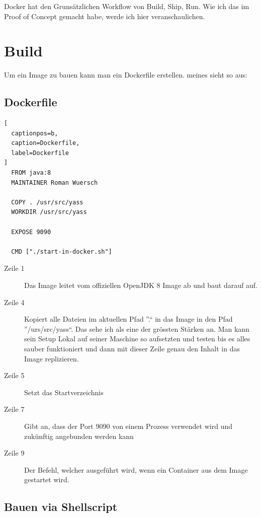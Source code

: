 Docker hat den Grunsätzlichen Workflow von Build, Ship, Run. Wie ich das im Proof of Concept
gemacht habe, werde ich hier veranschaulichen.

\section{Build}

Um ein Image zu bauen kann man ein Dockerfile erstellen. meines sieht so aus:

\subsection{Dockerfile}

\begin{lstlisting}[
  captionpos=b,
  caption=Dockerfile,
  label=Dockerfile
]
  FROM java:8
  MAINTAINER Roman Wuersch

  COPY . /usr/src/yass
  WORKDIR /usr/src/yass

  EXPOSE 9090

  CMD ["./start-in-docker.sh"]
\end{lstlisting}

\begin{description}

\item[Zeile 1] Das Image leitet vom offiziellen OpenJDK 8 Image ab und baut darauf auf.

\item[Zeile 4] Kopiert alle Dateien im aktuellen Pfad ”.“ in das Image in den Pfad ”/urs/src/yass“. Das
sehe ich als eine der grössten Stärken an. Man kann sein Setup Lokal auf seiner Maschine so aufsetzten und testen
bis es alles sauber funktioniert und dann mit dieser Zeile genau den Inhalt in das Image replizieren.

\item[Zeile 5] Setzt das Startverzeichnis

\item[Zeile 7] Gibt an, dass der Port 9090 von einem Prozess verwendet wird und zukünftig angebunden werden kann

\item[Zeile 9] Der Befehl, welcher ausgeführt wird, wenn ein Container aus dem Image gestartet wird.

\end{description}

\subsection{Bauen via Shellscript}


